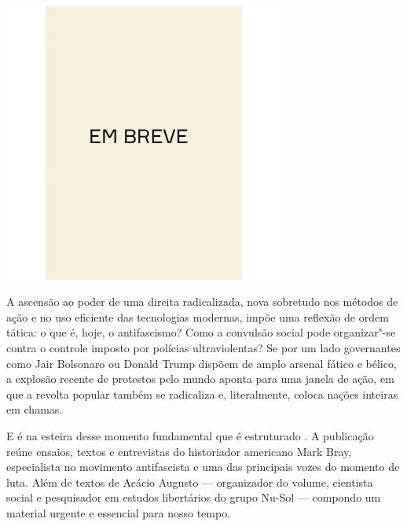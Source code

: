 \begin{center}
\hspace*{.5cm}\includegraphics[width=92mm]{./grid/breve.jpeg}
\end{center}

\hspace*{-7cm}\hrulefill\hspace*{-7cm}

\medskip

\noindent{}A ascensão ao poder de uma direita radicalizada, nova sobretudo nos métodos de ação e no uso eficiente das tecnologias modernas, impõe uma reflexão de ordem tática: o que é, hoje, o antifascismo? Como a convulsão social pode organizar"-se contra o controle imposto por polícias ultraviolentas?
Se por um lado governantes como Jair Bolsonaro ou Donald Trump dispõem de amplo arsenal fático e bélico, a explosão recente de protestos pelo mundo aponta para uma janela de ação, em que a revolta popular também se radicaliza e, literalmente, coloca nações inteiras em chamas.

E é na esteira desse momento fundamental que é estruturado {}. A publicação reúne ensaios, textos e entrevistas do historiador americano Mark Bray, especialista no movimento antifascista e uma das principais vozes do momento de luta. Além de textos de Acácio Augusto --- organizador do volume, cientista social e pesquisador em estudos libertários do grupo Nu-Sol --- compondo um material urgente e essencial para nosso tempo.

\vfill

\hspace*{-.4cm}\begin{minipage}[c]{.5\linewidth}
\small{
{}}
\end{minipage}

